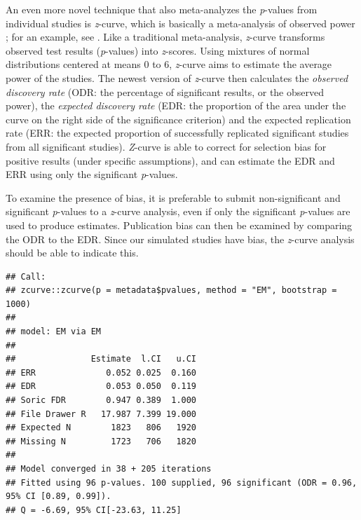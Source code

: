 \documentclass[
  oneside]{book}
\newenvironment{Shaded}{\begin{snugshade}}{\end{snugshade}}
\newcommand{\AttributeTok}[1]{\textcolor[rgb]{0.77,0.63,0.00}{#1}}
\newcommand{\CommentTok}[1]{\textcolor[rgb]{0.56,0.35,0.01}{\textit{#1}}}
\newcommand{\ConstantTok}[1]{\textcolor[rgb]{0.00,0.00,0.00}{#1}}
\newcommand{\DecValTok}[1]{\textcolor[rgb]{0.00,0.00,0.81}{#1}}
\newcommand{\FunctionTok}[1]{\textcolor[rgb]{0.00,0.00,0.00}{#1}}
\newcommand{\NormalTok}[1]{#1}
\newcommand{\OtherTok}[1]{\textcolor[rgb]{0.56,0.35,0.01}{#1}}
\newcommand{\SpecialCharTok}[1]{\textcolor[rgb]{0.00,0.00,0.00}{#1}}
\newcommand{\StringTok}[1]{\textcolor[rgb]{0.31,0.60,0.02}{#1}}
\begin{document}
An even more novel technique that also meta-analyzes the \emph{p}-values from individual studies is \emph{z}-curve, which is basically a meta-analysis of observed power \citep{bartos_z-curve20_2020, brunner_estimating_2020}; for an example, see \citep{sotola_garbage_2022}. Like a traditional meta-analysis, \emph{z}-curve transforms observed test results (\emph{p}-values) into \emph{z}-scores. Using mixtures of normal distributions centered at means 0 to 6, \emph{z}-curve aims to estimate the average power of the studies. The newest version of \emph{z}-curve then calculates the \emph{observed discovery rate} (ODR: the percentage of significant results, or the observed power), the \emph{expected discovery rate} (EDR: the proportion of the area under the curve on the right side of the significance criterion) and the expected replication rate (ERR: the expected proportion of successfully replicated significant studies from all significant studies). \emph{Z}-curve is able to correct for selection bias for positive results (under specific assumptions), and can estimate the EDR and ERR using only the significant \emph{p}-values.

To examine the presence of bias, it is preferable to submit non-significant and significant \emph{p}-values to a \emph{z}-curve analysis, even if only the significant \emph{p}-values are used to produce estimates. Publication bias can then be examined by comparing the ODR to the EDR. Since our simulated studies have bias, the \emph{z}-curve analysis should be able to indicate this.

\begin{Shaded}
\end{Shaded}

\begin{verbatim}
## Call:
## zcurve::zcurve(p = metadata$pvalues, method = "EM", bootstrap = 1000)
## 
## model: EM via EM
## 
##               Estimate  l.CI   u.CI
## ERR              0.052 0.025  0.160
## EDR              0.053 0.050  0.119
## Soric FDR        0.947 0.389  1.000
## File Drawer R   17.987 7.399 19.000
## Expected N        1823   806   1920
## Missing N         1723   706   1820
## 
## Model converged in 38 + 205 iterations
## Fitted using 96 p-values. 100 supplied, 96 significant (ODR = 0.96, 95% CI [0.89, 0.99]).
## Q = -6.69, 95% CI[-23.63, 11.25]
\end{verbatim}
\end{document}
